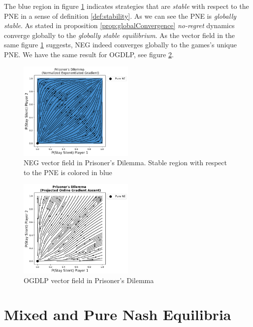 The blue region in figure \ref{fig:Prisoners2} indicates strategies that are \textit{stable} with respect to the PNE in a sense of definition \ref{def:stability}. As we can see the PNE is \textit{globally stable}. As stated in proposition \ref{prop:globalConvergence} \textit{no-regret} dynamics converge globally to the \textit{globally stable equilibrium}. As the vector field in the same figure \ref{fig:Prisoners2} suggests, NEG indeed converges globally to the games's unique PNE. We have the same result for OGDLP, see figure \ref{fig:Prisoners3}.

\begin{figure}[H]
    \centering
    \captionsetup{justification=centering}
    \includegraphics[width=0.5\textwidth]{logos/Prisoners2.png}
    \caption{NEG vector field in Prisoner's Dilemma. Stable region with respect to the PNE is colored in blue}
    \label{fig:Prisoners2}
\end{figure}

\begin{figure}[H]
    \centering
    \includegraphics[width=0.5\textwidth]{logos/Prisoners3.png}
    \caption{OGDLP vector field in Prisoner's Dilemma}
    \label{fig:Prisoners3}
\end{figure}

\section{Mixed and Pure Nash Equilibria}\label{section:MixedandPureNashEquilibria}


